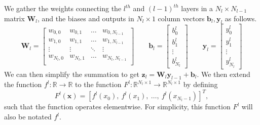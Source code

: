 \documentclass{article}
\theoremstyle{definition}
\begin{document}
We gather the weights connecting the $l^{th}$ and $(l-1)^{th}$ layers in a $N_{l} \times N_{l-1}$ matrix $\mathbf{W}_l$, and the biases and outputs in $N_l \times 1$ column vectors $\mathbf{b}_l, \mathbf{y}_l$ as follows.
\begin{equation*}
    \mathbf{W}_l = 
    \begin{bmatrix}
        w_{0,0} & w_{0,1} & \ldots & w_{0,N_{l-1}} \\
        w_{1,0} & w_{1,1} & \ldots & w_{1,N_{l-1}} \\
        \vdots & \vdots & \ddots & \vdots \\
        w_{N_{l},0} & w_{N_{l},1} & \ldots & w_{N_{l},N_{l-1}} \\
    \end{bmatrix}
    \qquad
    \mathbf{b}_l =
    \begin{bmatrix}
        b_0^l \\ b_1^l \\ \vdots \\ b_{N_l}^l
    \end{bmatrix}
    \qquad
    \mathbf{y}_l =
    \begin{bmatrix}
        y_0^l \\ y_1^l \\ \vdots \\ y_{N_l}^l
    \end{bmatrix}
\end{equation*}
We can then simplify the summation to get $\mathbf{z}_l = \mathbf{W}_l \mathbf{y}_{l-1} + \mathbf{b}_l$. We then extend the function $f^l: \mathbb{R} \to \mathbb{R}$ to the function $F^l: \mathbb{R}^{N_l \times 1} \to \mathbb{R}^{N_l \times 1}$ by defining
\begin{equation*}
    F^l(\boldsymbol{x}) = \left[ f^l \left( x_0 \right), \ f^l \left( x_1 \right), \ \ldots, \ f^l \left( x_{N_l - 1} \right) \right]^T,
\end{equation*}
such that the function operates elementwise. For simplicity, this function $F^l$ will also be notated $f^l$.
\end{document}
